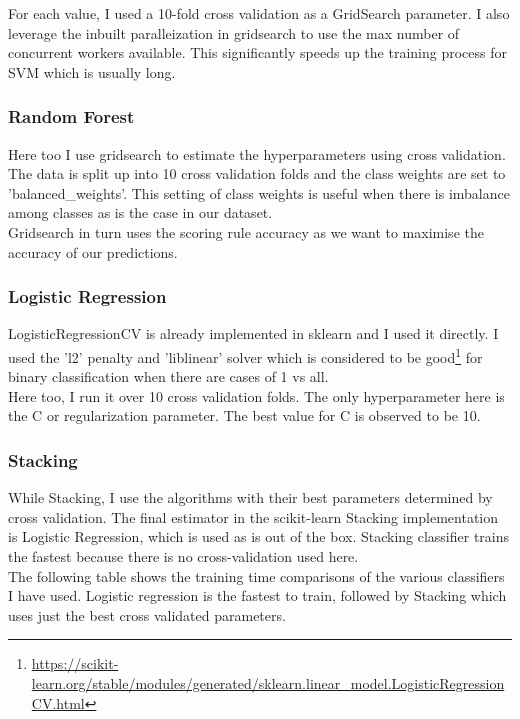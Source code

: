 \documentclass[12pt]{article}
\theoremstyle{definition}
\begin{document}
For each value, I used a 10-fold cross validation as a GridSearch parameter. I also leverage the inbuilt paralleization in gridsearch to use the max number of concurrent workers available. This significantly speeds up the training process for SVM which is usually long.\\

\subsubsection{Random Forest}
Here too I use gridsearch to estimate the hyperparameters using cross validation. The data is split up into 10 cross validation folds and the class weights are set to 'balanced\_weights'. This setting of class weights is useful when there is imbalance among classes as is the case in our dataset.\\

Gridsearch in turn uses the scoring rule accuracy as we want to maximise the accuracy of our predictions. \\

\subsubsection{Logistic Regression}
LogisticRegressionCV is already implemented in sklearn and I used it directly. I used the 'l2' penalty and 'liblinear' solver which is considered to be good\footnote{\url{https://scikit-learn.org/stable/modules/generated/sklearn.linear_model.LogisticRegressionCV.html}} for binary classification when there are cases of 1 vs all. \\

Here too, I run it over 10 cross validation folds. The only hyperparameter here is the C or regularization parameter. The best value for C is observed to be 10.\\

\subsubsection{Stacking}
While Stacking, I use the algorithms with their best parameters determined by cross validation. The final estimator in the scikit-learn Stacking implementation is Logistic Regression, which is used as is out of the box. Stacking classifier trains the fastest because there is no cross-validation used here. \\

The following table shows the training time comparisons of the various classifiers I have used. Logistic regression is the fastest to train, followed by Stacking which uses just the best cross validated parameters.
\end{document}
